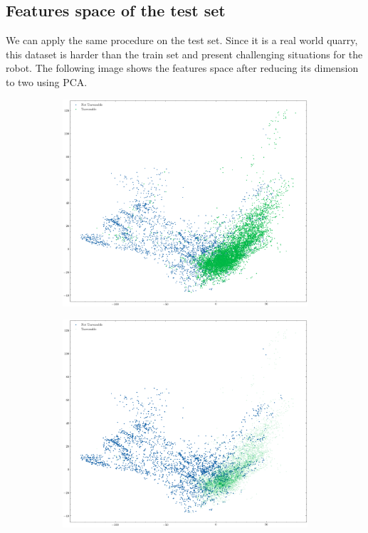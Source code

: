 \documentclass[../document.tex]{subfiles}
\begin{document}
\subsection{Features space of the test set}
We can apply the same procedure on the test set. Since it is a real world quarry, this dataset is harder than the train set and present challenging situations for the robot. The following image shows the features space after reducing its dimension to two using PCA.
\begin{figure} [htbp]
    \centering
    \begin{subfigure}[b]{1\textwidth}
        \includegraphics[width=\linewidth]{../img/5/pca/pca-test.png}
    \end{subfigure}
    \begin{subfigure}[b]{0.48\textwidth}
        \includegraphics[width=\linewidth]{../img/5/pca/pca-test-0.png}

\end{subfigure}
\end{figure}
\end{document}
